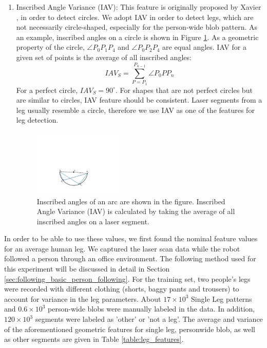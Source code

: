 \begin{enumerate}
\item Inscribed Angle Variance (IAV): This feature is originally proposed by Xavier \cite{xavier2005fast}, in order to detect circles. We adopt IAV in order to detect legs, which are not necessarily circle-shaped, especially for the person-wide blob pattern. As an example, inscribed angles on a circle is shown in Figure \ref{fig:iav}. As a geometric property of the circle, $\angle P_0P_1P_4$ and $\angle P_0P_2P_4$ are equal angles. IAV for a given set of points is the average of all inscribed angles: 
\[
IAV_S = \sum_{P = P_1}^{P_{n-1}} \angle P_0PP_n
\]
For a perfect circle, $IAV_S=90^{\circ}$. For shapes that are not perfect circles but are similar to circles, IAV feature should be consistent. Laser segments from a leg usually resemble a circle, therefore we use IAV as one of the features for leg detection.

\begin{figure}[ht!]
\centering
\includegraphics[width=0.4\textwidth]{pics/iav}
\caption{Inscribed angles of an arc are shown in the figure. Inscribed Angle Variance (IAV) is calculated by taking the average of all inscribed angles on a laser segment.}
\label{fig:iav}
\end{figure}

\end{enumerate}

In order to be able to use these values, we first found the nominal feature values for an average human leg. We captured the laser scan data while the robot followed a person through an office environment. The following method used for this experiment will be discussed in detail in Section \ref{sec:following_basic_person_following}. For the training set, two people's legs were recorded with different clothing (shorts, baggy pants and trousers) to account for variance in the leg parameters. About $17\times 10^3$ Single Leg patterns and $0.6\times 10^3$ person-wide blobs were manually labeled in the data. In addition, $120\times 10^3$ segments were labeled as 'other' or 'not a leg'. The average and variance of the aforementioned geometric features for single leg, personwide blob, as well as other segments are given in Table \ref{table:leg_features}. 

